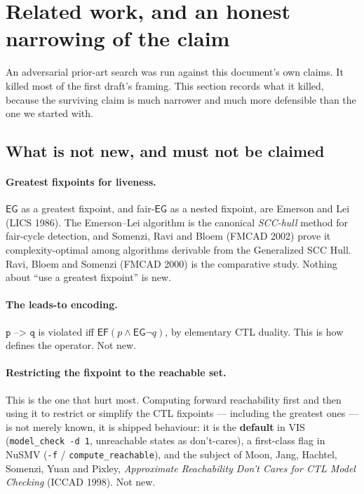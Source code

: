 \section{Related work, and an honest narrowing of the claim}
\label{sec:related}

An adversarial prior-art search was run against this document's own claims. It killed most of the
first draft's framing. This section records what it killed, because the surviving claim is much
narrower and much more defensible than the one we started with.

\subsection{What is not new, and must not be claimed}

\paragraph{Greatest fixpoints for liveness.}
$\mathsf{EG}$ as a greatest fixpoint, and fair-$\mathsf{EG}$ as a nested fixpoint, are Emerson and
Lei (LICS 1986). The Emerson--Lei algorithm is the canonical \emph{SCC-hull} method for fair-cycle
detection, and Somenzi, Ravi and Bloem (FMCAD 2002) prove it complexity-optimal among algorithms
derivable from the Generalized SCC Hull. Ravi, Bloem and Somenzi (FMCAD 2000) is the comparative
study. Nothing about ``use a greatest fixpoint'' is new.

\paragraph{The leads-to encoding.}
$\texttt{p --> q}$ is violated iff $\mathsf{EF}(p \wedge \mathsf{EG}\lnot q)$, by elementary CTL
duality. This is how \uppaal{} defines the operator. Not new.

\paragraph{Restricting the fixpoint to the reachable set.}
This is the one that hurt most. Computing forward reachability first and then using it to restrict
or simplify the CTL fixpoints --- including the greatest ones --- is not merely known, it is
shipped behaviour: it is the \textbf{default} in VIS (\texttt{model\_check -d 1}, unreachable states
as don't-cares), a first-class flag in NuSMV (\texttt{-f} / \texttt{compute\_reachable}), and the
subject of Moon, Jang, Hachtel, Somenzi, Yuan and Pixley, \emph{Approximate Reachability Don't Cares
for CTL Model Checking} (ICCAD 1998). Not new.

